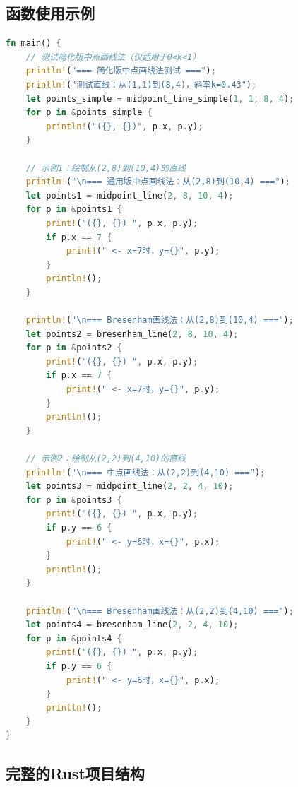 \documentclass[12pt,a4paper]{article}
\begin{document}
\subsection{函数使用示例}

\begin{lstlisting}[language=Rust,caption=函数使用示例]
fn main() {
    // 测试简化版中点画线法（仅适用于0<k<1）
    println!("=== 简化版中点画线法测试 ===");
    println!("测试直线：从(1,1)到(8,4)，斜率k=0.43");
    let points_simple = midpoint_line_simple(1, 1, 8, 4);
    for p in &points_simple {
        println!("({}, {})", p.x, p.y);
    }
    
    // 示例1：绘制从(2,8)到(10,4)的直线
    println!("\n=== 通用版中点画线法：从(2,8)到(10,4) ===");
    let points1 = midpoint_line(2, 8, 10, 4);
    for p in &points1 {
        print!("({}, {}) ", p.x, p.y);
        if p.x == 7 {
            print!(" <- x=7时，y={}", p.y);
        }
        println!();
    }
    
    println!("\n=== Bresenham画线法：从(2,8)到(10,4) ===");
    let points2 = bresenham_line(2, 8, 10, 4);
    for p in &points2 {
        print!("({}, {}) ", p.x, p.y);
        if p.x == 7 {
            print!(" <- x=7时，y={}", p.y);
        }
        println!();
    }
    
    // 示例2：绘制从(2,2)到(4,10)的直线
    println!("\n=== 中点画线法：从(2,2)到(4,10) ===");
    let points3 = midpoint_line(2, 2, 4, 10);
    for p in &points3 {
        print!("({}, {}) ", p.x, p.y);
        if p.y == 6 {
            print!(" <- y=6时，x={}", p.x);
        }
        println!();
    }
    
    println!("\n=== Bresenham画线法：从(2,2)到(4,10) ===");
    let points4 = bresenham_line(2, 2, 4, 10);
    for p in &points4 {
        print!("({}, {}) ", p.x, p.y);
        if p.y == 6 {
            print!(" <- y=6时，x={}", p.x);
        }
        println!();
    }
}
\end{lstlisting}

\subsection{完整的Rust项目结构}
\end{document}

